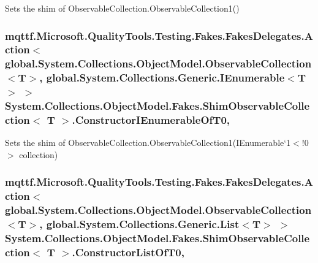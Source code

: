Sets the shim of Observable\-Collection{.\-Observable\-Collection}1()

\hypertarget{class_system_1_1_collections_1_1_object_model_1_1_fakes_1_1_shim_observable_collection_3_01_t_01_4_a362d9f6d055e10871a16d1d8d8f049ff}{
\subsubsection[{Constructor\-I\-Enumerable\-Of\-T0}]{\setlength{\rightskip}{0pt plus 5cm}mqttf.\-Microsoft.\-Quality\-Tools.\-Testing.\-Fakes.\-Fakes\-Delegates.\-Action$<$global.\-System.\-Collections.\-Object\-Model.\-Observable\-Collection$<$T$>$, global.\-System.\-Collections.\-Generic.\-I\-Enumerable$<$T$>$ $>$ System.\-Collections.\-Object\-Model.\-Fakes.\-Shim\-Observable\-Collection$<$ T $>$.Constructor\-I\-Enumerable\-Of\-T0\hspace{0.3cm}{\ttfamily [static]}, {\ttfamily [set]}}}\label{class_system_1_1_collections_1_1_object_model_1_1_fakes_1_1_shim_observable_collection_3_01_t_01_4_a362d9f6d055e10871a16d1d8d8f049ff}


Sets the shim of Observable\-Collection{.\-Observable\-Collection}1(I\-Enumerable`1$<$!0$>$ collection)

\hypertarget{class_system_1_1_collections_1_1_object_model_1_1_fakes_1_1_shim_observable_collection_3_01_t_01_4_a86104a66c19c565ef9765b0531b26d09}{
\subsubsection[{Constructor\-List\-Of\-T0}]{\setlength{\rightskip}{0pt plus 5cm}mqttf.\-Microsoft.\-Quality\-Tools.\-Testing.\-Fakes.\-Fakes\-Delegates.\-Action$<$global.\-System.\-Collections.\-Object\-Model.\-Observable\-Collection$<$T$>$, global.\-System.\-Collections.\-Generic.\-List$<$T$>$ $>$ System.\-Collections.\-Object\-Model.\-Fakes.\-Shim\-Observable\-Collection$<$ T $>$.Constructor\-List\-Of\-T0\hspace{0.3cm}{\ttfamily [static]}, {\ttfamily [set]}}}\label{class_system_1_1_collections_1_1_object_model_1_1_fakes_1_1_shim_observable_collection_3_01_t_01_4_a86104a66c19c565ef9765b0531b26d09}


